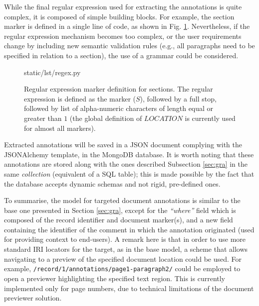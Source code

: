 While the final regular expression used for extracting the annotations is quite
complex, it is composed of simple building blocks. For example, the section
marker is defined in a single line of code, as shown in Fig. \ref{lst:regex}.
Nevertheless, if the regular expression mechanism becomes too complex, or the
user requirements change by including new semantic validation rules (e.g., all
paragraphs need to be specified in relation to a section), the use of a
grammar could be considered.

\begin{figure}[!ht]
  
    {static/lst/regex.py}
    \caption[Regular expression marker definition for sections]
            {Regular expression marker definition for sections. The regular
             expression is defined as the marker ($S$), followed by a full stop,
             followed by list of alpha-numeric characters of length equal or
             greater than $1$ (the global definition of $LOCATION$ is currently
             used for almost all markers).}
    \label{lst:regex}
\end{figure}

\newpage

Extracted annotations will be saved in a JSON document complying with the
JSONAlchemy template, in the MongoDB database. It is worth noting that these
annotations are stored along with the ones described Subsection \ref{sec:gra}
in the same \textit{collection} (equivalent of a SQL table); this is made
possible by the fact that the database accepts dynamic schemas and not rigid,
pre-defined ones.

To summarise, the model for targeted document annotations is similar to the
base one presented in Section \ref{sec:gra}, except for the \textit{``where''}
field which is composed of the record identifier and document marker(s), and a
new field containing the identifier of the comment in which the annotation
originated (used for providing context to end-users). A remark here is that in
order to use more standard IRI locators for the target, as in the base model, a
scheme that allows navigating to a preview of the specified document location
could be used.  For example, \texttt{/record/1/annotations/page1-paragraph2/}
could be employed to open a previewer highlighting the specified text region.
This is currently implemented only for page numbers, due to technical
limitations of the document previewer solution.

